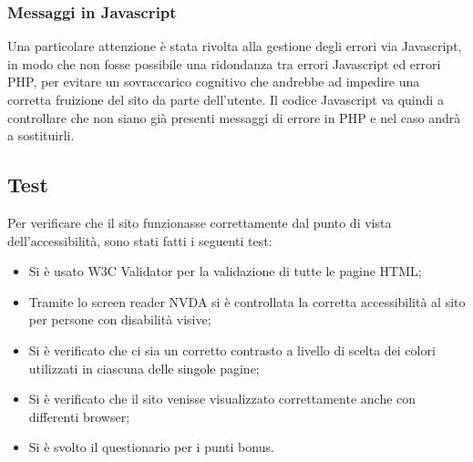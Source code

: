     \subsubsection{Messaggi in Javascript}
    Una particolare attenzione è stata rivolta alla gestione degli errori via Javascript, in modo che non fosse possibile una ridondanza tra errori Javascript ed errori PHP, per evitare un sovraccarico cognitivo che andrebbe ad impedire una corretta fruizione del sito da parte dell’utente. Il codice Javascript va quindi a controllare che non siano già presenti messaggi di errore in PHP e nel caso andrà a sostituirli.
    \subsection{Test}
    \label{Test}
    Per verificare che il sito funzionasse correttamente dal punto di vista dell'accessibilità, sono stati fatti i seguenti test:
    \begin{itemize}
        \item Si è usato W3C Validator per la validazione di tutte le pagine HTML;
        \item Tramite lo screen reader NVDA si è controllata la corretta accessibilità al sito per persone con disabilità visive;
        \item Si è verificato che ci sia un corretto contrasto a livello di scelta dei colori utilizzati in ciascuna delle singole pagine;
        \item Si è  verificato che il sito venisse visualizzato correttamente anche con differenti browser;
        \item Si è svolto il questionario per i punti bonus.
    \end{itemize}